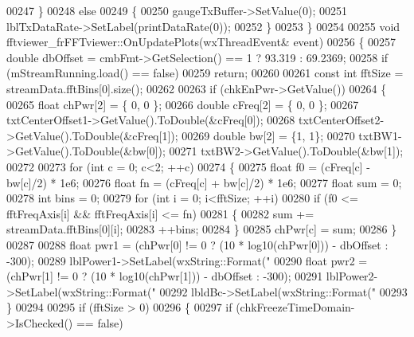 \begin{DoxyCode}
00247     \}
00248     \textcolor{keywordflow}{else}
00249     \{
00250         gaugeTxBuffer->SetValue(0);
00251         lblTxDataRate->SetLabel(printDataRate(0));
00252     \}
00253 \}
00254 
00255 \textcolor{keywordtype}{void} fftviewer_frFFTviewer::OnUpdatePlots(wxThreadEvent& event)
00256 \{
00257     \textcolor{keywordtype}{double} dbOffset = cmbFmt->GetSelection() == 1 ? 93.319 : 69.2369;
00258     \textcolor{keywordflow}{if} (mStreamRunning.load() == \textcolor{keyword}{false})
00259         \textcolor{keywordflow}{return};
00260 
00261     \textcolor{keyword}{const} \textcolor{keywordtype}{int} fftSize = streamData.fftBins[0].size();
00262 
00263     \textcolor{keywordflow}{if} (chkEnPwr->GetValue())
00264     \{
00265         \textcolor{keywordtype}{float} chPwr[2] = \{ 0, 0 \};
00266         \textcolor{keywordtype}{double} cFreq[2] = \{ 0, 0 \};
00267         txtCenterOffset1->GetValue().ToDouble(&cFreq[0]);
00268         txtCenterOffset2->GetValue().ToDouble(&cFreq[1]);
00269         \textcolor{keywordtype}{double} bw[2] = \{1, 1\};
00270         txtBW1->GetValue().ToDouble(&bw[0]);
00271         txtBW2->GetValue().ToDouble(&bw[1]);
00272 
00273         \textcolor{keywordflow}{for} (\textcolor{keywordtype}{int} c = 0; c<2; ++c)
00274         \{
00275             \textcolor{keywordtype}{float} f0 = (cFreq[c] - bw[c]/2) * 1e6;
00276             \textcolor{keywordtype}{float} fn = (cFreq[c] + bw[c]/2) * 1e6;
00277             \textcolor{keywordtype}{float} sum = 0;
00278             \textcolor{keywordtype}{int} bins = 0;
00279             \textcolor{keywordflow}{for} (\textcolor{keywordtype}{int} i = 0; i<fftSize; ++i)
00280                 \textcolor{keywordflow}{if} (f0 <= fftFreqAxis[i] && fftFreqAxis[i] <= fn)
00281                 \{
00282                     sum += streamData.fftBins[0][i];
00283                     ++bins;
00284                 \}
00285             chPwr[c] = sum;
00286         \}
00287 
00288         \textcolor{keywordtype}{float} pwr1 = (chPwr[0] != 0 ? (10 * log10(chPwr[0])) - dbOffset : -300);
00289         lblPower1->SetLabel(wxString::Format(\textcolor{stringliteral}{"%
00290         \textcolor{keywordtype}{float} pwr2 = (chPwr[1] != 0 ? (10 * log10(chPwr[1])) - dbOffset : -300);
00291         lblPower2->SetLabel(wxString::Format(\textcolor{stringliteral}{"%
00292         lbldBc->SetLabel(wxString::Format(\textcolor{stringliteral}{"%
00293     \}
00294 
00295     \textcolor{keywordflow}{if} (fftSize > 0)
00296     \{
00297         \textcolor{keywordflow}{if} (chkFreezeTimeDomain->IsChecked() == \textcolor{keyword}{false})
}}}
\end{DoxyCode}
